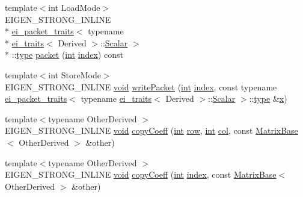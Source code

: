\begin{DoxyCompactItemize}
\item 
{\footnotesize template$<$int Load\-Mode$>$ }\\E\-I\-G\-E\-N\-\_\-\-S\-T\-R\-O\-N\-G\-\_\-\-I\-N\-L\-I\-N\-E \\*
\hyperlink{structei__packet__traits}{ei\-\_\-packet\-\_\-traits}$<$ typename \\*
\hyperlink{structei__traits}{ei\-\_\-traits}$<$ Derived $>$\-::\hyperlink{class_matrix_base_a625df8339dc2d816cbc0fd66e7dadaf5}{Scalar} $>$\\*
\-::\hyperlink{glext_8h_a7d05960f4f1c1b11f3177dc963a45d86}{type} \hyperlink{class_matrix_base_a6532b91df5726ba450a0dabce358b58c}{packet} (\hyperlink{ioapi_8h_a787fa3cf048117ba7123753c1e74fcd6}{int} \hyperlink{glext_8h_ab47dd9958bcadea08866b42bf358e95e}{index}) const 
\item 
{\footnotesize template$<$int Store\-Mode$>$ }\\E\-I\-G\-E\-N\-\_\-\-S\-T\-R\-O\-N\-G\-\_\-\-I\-N\-L\-I\-N\-E \hyperlink{group___u_a_v_objects_plugin_ga444cf2ff3f0ecbe028adce838d373f5c}{void} \hyperlink{class_matrix_base_acb271944fdd941de41ac40adff333f56}{write\-Packet} (\hyperlink{ioapi_8h_a787fa3cf048117ba7123753c1e74fcd6}{int} \hyperlink{glext_8h_ab47dd9958bcadea08866b42bf358e95e}{index}, const typename \hyperlink{structei__packet__traits}{ei\-\_\-packet\-\_\-traits}$<$ typename \hyperlink{structei__traits}{ei\-\_\-traits}$<$ Derived $>$\-::\hyperlink{class_matrix_base_a625df8339dc2d816cbc0fd66e7dadaf5}{Scalar} $>$\-::\hyperlink{glext_8h_a7d05960f4f1c1b11f3177dc963a45d86}{type} \&\hyperlink{glext_8h_a1db9d104e3c2128177f26aff7b46982f}{x})
\item 
{\footnotesize template$<$typename Other\-Derived $>$ }\\E\-I\-G\-E\-N\-\_\-\-S\-T\-R\-O\-N\-G\-\_\-\-I\-N\-L\-I\-N\-E \hyperlink{group___u_a_v_objects_plugin_ga444cf2ff3f0ecbe028adce838d373f5c}{void} \hyperlink{class_matrix_base_a2b3bb291010752e6a51d373facb60191}{copy\-Coeff} (\hyperlink{ioapi_8h_a787fa3cf048117ba7123753c1e74fcd6}{int} \hyperlink{glext_8h_a11b277b422822f784ee248b43eee3e1e}{row}, \hyperlink{ioapi_8h_a787fa3cf048117ba7123753c1e74fcd6}{int} \hyperlink{class_matrix_base_ae3c94b0f25b4273c7a8125169bdf60e0}{col}, const \hyperlink{class_matrix_base}{Matrix\-Base}$<$ Other\-Derived $>$ \&other)
\item 
{\footnotesize template$<$typename Other\-Derived $>$ }\\E\-I\-G\-E\-N\-\_\-\-S\-T\-R\-O\-N\-G\-\_\-\-I\-N\-L\-I\-N\-E \hyperlink{group___u_a_v_objects_plugin_ga444cf2ff3f0ecbe028adce838d373f5c}{void} \hyperlink{class_matrix_base_aae9f61aeb25cdabaf929f3f8e0d38d31}{copy\-Coeff} (\hyperlink{ioapi_8h_a787fa3cf048117ba7123753c1e74fcd6}{int} \hyperlink{glext_8h_ab47dd9958bcadea08866b42bf358e95e}{index}, const \hyperlink{class_matrix_base}{Matrix\-Base}$<$ Other\-Derived $>$ \&other)

\end{DoxyCompactItemize}
